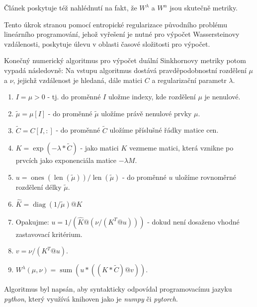 \documentclass[czech]{article}
\begin{document}

Článek \cite{wass_computation} poskytuje též nahlédnutí na fakt, že $W^\lambda$ a $W^\alpha$ jsou skutečně metriky.

Tento úkrok stranou pomocí entropické regularizace původního problému lineárního programování,
jehož vyřešení je nutné pro výpočet Wassersteinovy vzdálenosti, poskytuje úlevu v oblasti časové složitosti pro výpočet.

Konečný numerický algoritmus pro výpočet duální Sinkhornovy metriky potom vypadá následovně:
Na vstupu algoritmus dostává pravděpodobnostní rozdělení $\mu$ a $\nu$, jejichž vzdálenost je hledaná,
dále matici $C$ a regularizační parametr $\lambda$.
\begin{enumerate}
    \item $I = \mu > 0$ - tj. do proměnné $I$ uložme indexy, kde rozdělení $\mu$ je nenulové.
    \item $\tilde{\mu} = \mu [I]$ - do proměnné $\tilde{\mu}$ uložíme právě nenulové prvky $\mu$.
    \item $\tilde{C} = C [I, :]$ - do proměnné $\tilde{C}$ uložíme příslušné řádky matice cen.
    \item $K = \operatorname{exp}(- \lambda * \tilde{C})$ - jako matici $K$ vezmeme matici,
    která vznikne po prvcích jako exponenciála matice $- \lambda M$.
    \item $u = \operatorname{ones}(\operatorname{len}(\tilde{\mu})) / \operatorname{len}(\tilde{\mu})$
    - do proměnné $u$ uložíme rovnoměrné rozdělení délky $\tilde{\mu}$.
    \item $\hat{K} = \operatorname{diag}(1 / \tilde{\mu}) @ K$
    \item Opakujme:
    $u = 1 / (\hat{K} @ (\nu / (K^T @ u)))$ - dokud není dosaženo vhodné zastavovací kritérium.
    \item $v = \nu / (K^T @ u)$.
    \item $W^\lambda (\mu, \nu) = \operatorname{sum}(u * ((K * \tilde{C}) @ v))$.
\end{enumerate}
Algoritmus byl napsán, aby syntakticky odpovídal programovacímu jazyku \emph{python}, který využívá knihoven jako je \emph{numpy}
či \emph{pytorch}.
\end{document}
